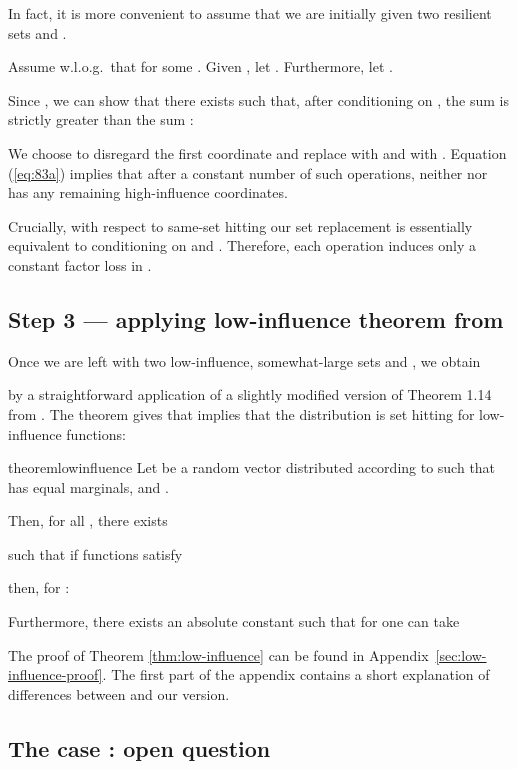 \documentclass{daj}
\newcommand{\1}{\mathbbm{1}}
\theoremstyle{plain}
\theoremstyle{definition}
\begin{document}
In fact, it is more convenient to assume that we are initially
given two resilient sets  and .

Assume w.l.o.g.~that  for some .
Given , let 
.
Furthermore, let .

Since , we can show that
there exists  such that, after conditioning on
,
the sum  is strictly greater than
the sum :


We choose to disregard the first coordinate and replace
 with  and  with .
Equation (\ref{eq:83a}) implies that after a constant number of such 
operations, neither  nor  has any remaining high-influence coordinates. 

Crucially, with respect to same-set hitting our set replacement
is essentially equivalent to conditioning on
 and .
Therefore, each operation induces only a constant factor loss in 
.

\subsection{Step 3 --- applying low-influence theorem from 
\texorpdfstring{\cite{Mos10}}{[Mos10]}}

Once we are left with two low-influence, somewhat-large sets 
and , we 
obtain

by a straightforward application of a slightly
modified version of Theorem 1.14 from \cite{Mos10}.
The theorem gives that  implies that
the distribution  is set hitting for low-influence functions:

\begin{restatable}{theorem}{lowinfluence}
\label{thm:low-influence}
Let  be a random vector distributed
according to  
such that  has equal marginals, 
and .

Then, for all , there exists 

such that if functions 
 satisfy

then, for :


Furthermore, there exists an absolute constant  such that
for  one can take

\end{restatable}

The proof of Theorem \ref{thm:low-influence} can be found in
Appendix~\ref{sec:low-influence-proof}.
The first part of the appendix contains a short
explanation of differences
between \cite{Mos10} and our version.

\subsection{The case
\texorpdfstring{}{rho = 1}
: open question}
\label{sec:open}
\end{document}
